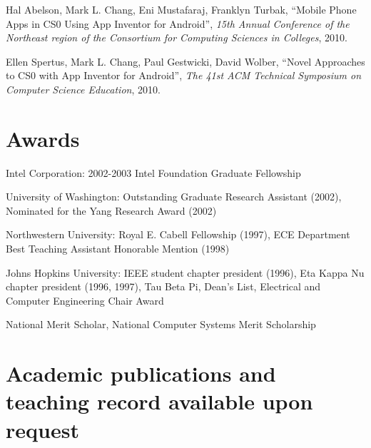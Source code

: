 \documentclass[line]{res}
\begin{document}
\begin{resume}
	Hal Abelson, Mark L. Chang, Eni Mustafaraj, Franklyn Turbak, ``Mobile Phone Apps in CS0 Using App Inventor for Android'', \textit{15th Annual Conference of the Northeast region of the Consortium for Computing Sciences in Colleges}, 2010.
	
	Ellen Spertus, Mark L. Chang, Paul Gestwicki, David Wolber, ``Novel Approaches to CS0 with App Inventor for Android'', \textit{The 41st ACM Technical Symposium on Computer Science Education}, 2010.
	
	\section{\sc Awards} 
	
	Intel Corporation: 2002-2003 Intel Foundation Graduate Fellowship
	
	University of Washington: Outstanding Graduate Research Assistant (2002), Nominated for the Yang Research Award (2002)
	
	Northwestern University: Royal E. Cabell Fellowship (1997), ECE Department Best Teaching Assistant Honorable Mention (1998)
	
	Johns Hopkins University: IEEE student chapter president (1996), Eta Kappa Nu chapter president (1996, 1997), Tau Beta Pi, Dean's List, Electrical and Computer Engineering Chair Award
	
	National Merit Scholar, National Computer Systems Merit Scholarship

	\section{\sc Academic publications and teaching record available upon request}


	
\end{resume}
\end{document}
